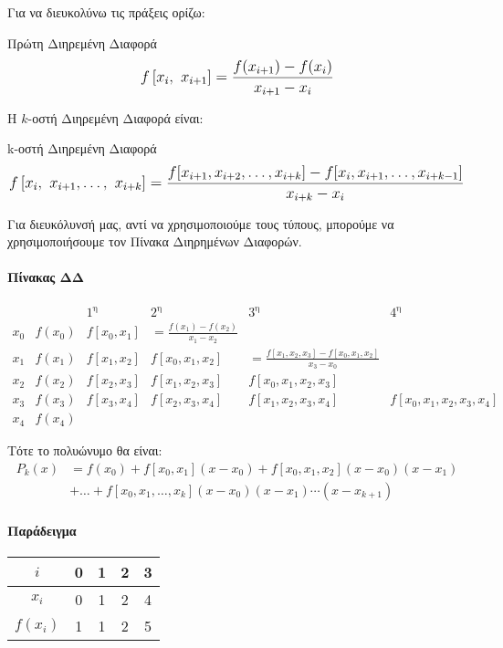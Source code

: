 \documentclass[11pt,a4paper,notitlepage,fleqn,final]{article}
\begin{document}
 	Για να διευκολύνω τις πράξεις ορίζω:
 	\begin{defn}{Πρώτη Διηρεμένη Διαφορά}{}
 		\[
 		\mathlarger{
 		f\left[x_i,\ x_{i+1}\right] =
 		\frac{f(x_{i+1})-f(x_i)}{x_{i+1}-x_i}
 	    }
 		\]
 	\end{defn}

 	Η \( k \)-οστή Διηρεμένη Διαφορά είναι:
 	\begin{defn}{k-οστή Διηρεμένη Διαφορά}{}
 		\[
 		\mathlarger{
 			f\left[x_i,\ x_{i+1}, \dots,\ x_{i+k}\right] =
 			\frac{
 				f[x_{i+1},x_{i+2},\dots,x_{i+k}]
 				- f[x_i,x_{i+1},\dots,x_{i+k-1}]
 				}{x_{i+k}-x_i}
 		}
 		\]
 	\end{defn}

 	Για διευκόλυνσή μας, αντί να χρησιμοποιούμε τους τύπους, μπορούμε
 	να χρησιμοποιήσουμε τον Πίνακα Διηρημένων Διαφορών.

 	\paragraph{Πίνακας ΔΔ}
 	\[
 	\begin{array}{llllll}
 	 & & 1^{\text{η}} & 2^\text{η} & 3^\text{η} & 4^\text{η}\\
 	x_0 & f(x_0) & f[x_0,x_1] & = \frac{f(x_1)-f(x_2)}{x_1-x_2} & \\
 	x_1 & f(x_1) & f[x_1,x_2] & f[x_0,x_1,x_2] & =
 	\frac{f[x_1,x_2,x_3]-f[x_0,x_1,x_2]}{x_3-x_0} \\
 	x_2 & f(x_2) & f[x_2,x_3] & f[x_1,x_2,x_3] & f[x_0,x_1,x_2,x_3]\\
 	x_3 & f(x_3) & f[x_3,x_4] & f[x_2,x_3,x_4] & f[x_1,x_2,x_3,x_4]
 	& f[x_0,x_1,x_2,x_3,x_4]
 	\\
 	x_4 & f(x_4) & &
 	\end{array}
 	\]

 	Τότε το πολυώνυμο θα είναι:
 	\begin{align*}
 		P_k(x) &= f(x_0) + f[x_0,x_1](x-x_0) +
 		f[x_0,x_1,x_2](x-x_0)(x-x_1)
 		\\ & + \dots +
 		f[x_0,x_1,\dots,x_k](x-x_0)(x-x_1)\cdots(x-x_{k+1})
 	\end{align*}

 	\paragraph{Παράδειγμα}
 	\hspace{0pt}

 	\begin{tabular}{|c|c|c|c|c|}
 		\hline
 		\(i\) & 0 & 1 & 2 & 3 \\
 		\hline
 		\(x_i\) & 0 & 1 & 2 & 4 \\
 		\hline
 		\(f(x_i)\) & 1 & 1 & 2 & 5 \\
 		\hline
 	\end{tabular}
\end{document}
